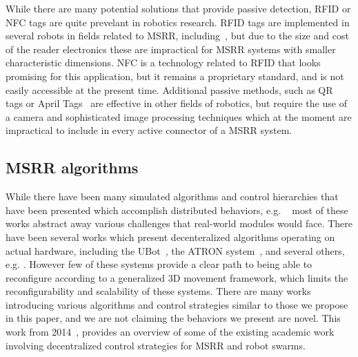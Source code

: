 While there are many potential solutions that provide passive detection, RFID or NFC tags are quite prevelant in robotics research. RFID tags are implemented in several robots in fields related to MSRR, including~\cite{werfel2006distributed}, but due to the size and cost of the reader electronics these are impractical for MSRR systems with smaller characteristic dimensions. NFC is a technology related to RFID that looks promising for this application, but it remains a proprietary standard, and is not easily accessible at the present time. Additional passive methods, such as QR tags or April Tags~\cite{wang2016iros} are effective in other fields of robotics, but require the use of a camera and sophisticated image processing techniques which at the moment are impractical to include in every active connector of a MSRR system.

\subsection{MSRR algorithms}
\label{ssec:RW-Algorithmic}
While there have been many simulated algorithms and control hierarchies that have been presented which accomplish distributed behaviors, e.g. ~\cite{Jones-ICRA03, butler2002generic, stoy-747simulation-2004} most of these works abstract away various challenges that real-world modules would face. There have been several works which present decenteralized algorithms operating on actual hardware, including the UBot~\cite{zhu2015simplified}, the ATRON system~\cite{christensen2013distributed}, and several others, e.g. \cite{germanswarm-Levi-2014, Yim-IROS07}. However few of these systems provide a clear path to being able to reconfigure according to a generalized 3D movement framework, which limits the reconfigurability and scalability of these systems. There are many works introducing various algorithms and control strategies similar to those we propose in this paper, and we are not claiming the behaviors we present are novel. This work from 2014~\cite{abukhalil2013survey}, provides an overview of some of the existing academic work involving decentralized control strategies for MSRR and robot swarms.


